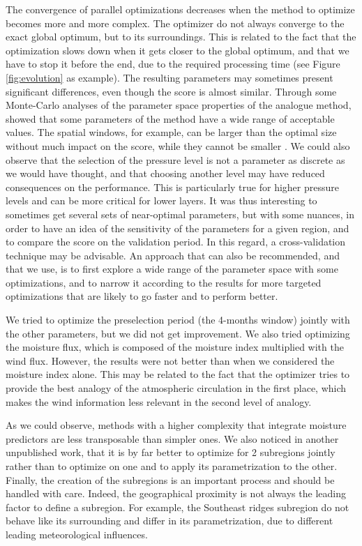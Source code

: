 \documentclass{ametsoc}
\begin{document}
The convergence of parallel optimizations decreases when the method to optimize becomes more and more complex. The optimizer do not always converge to the exact global optimum, but to its surroundings. This is related to the fact that the optimization slows down when it gets closer to the global optimum, and that we have to stop it before the end, due to the required processing time (see Figure \ref{fig:evolution} as example). The resulting parameters may sometimes present significant differences, even though the score is almost similar. Through some Monte-Carlo analyses of the parameter space properties of the analogue method, \citet{Horton2012a} showed that some parameters of the method have a wide range of acceptable values. The spatial windows, for example, can be larger than the optimal size without much impact on the score, while they cannot be smaller \citep[see also][]{Bontron2004}. We could also observe that the selection of the pressure level is not a parameter as discrete as we would have thought, and that choosing another level may have reduced consequences on the performance. This is particularly true for higher pressure levels and can be more critical for lower layers. It was thus interesting to sometimes get several sets of near-optimal parameters, but with some nuances, in order to have an idea of the sensitivity of the parameters for a given region, and to compare the score on the validation period. In this regard, a cross-validation technique may be advisable. An approach that can also be recommended, and that we use, is to first explore a wide range of the parameter space with some optimizations, and to narrow it according to the results for more targeted optimizations that are likely to go faster and to perform better.

We tried to optimize the preselection period (the 4-months window) jointly with the other parameters, but we did not get improvement. We also tried optimizing the moisture flux, which is composed of the moisture index multiplied with the wind flux. However, the results were not better than when we considered the moisture index alone. This may be related to the fact that the optimizer tries to provide the best analogy of the atmospheric circulation in the first place, which makes the wind information less relevant in the second level of analogy.

As we could observe, methods with a higher complexity that integrate moisture predictors are less transposable than simpler ones. We also noticed in another unpublished work, that it is by far better to optimize for 2 subregions jointly rather than to optimize on one and to apply its parametrization to the other. Finally, the creation of the subregions is an important process and should be handled with care. Indeed, the geographical proximity is not always the leading factor to define a subregion. For example, the Southeast ridges subregion do not behave like its surrounding and differ in its parametrization, due to different leading meteorological influences.
\end{document}
